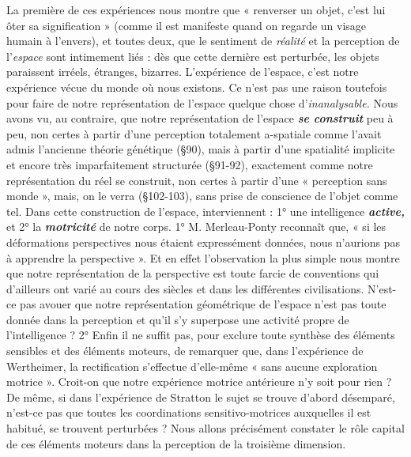 \vspace{0.31cm}

La première de ces expériences nous montre que « renverser un
objet, c’est lui ôter sa signification » (comme il est manifeste quand on
regarde un visage humain à l’envers), et toutes deux, que le sentiment
de {\it réalité} et la perception de l’{\it espace} sont intimement liés : dès que
cette dernière est perturbée, les objets paraissent irréels, étranges,
bizarres. L'expérience de l’espace, c’est notre expérience vécue du
monde où nous existons. Ce n’est pas une raison toutefois pour faire
de notre représentation de l’espace quelque chose d’{\it inanalysable.}
Nous avons vu, au contraire, que notre représentation de l’espace
\textbf{\textit {se construit}} peu à peu, non certes à partir d’une perception totalement
a-spatiale comme l’avait admis l’ancienne théorie génétique
(\S 90), mais à partir d’une spatialité implicite et encore très imparfaitement
structurée (\S 91-92), exactement comme notre représentation
du réel se construit, non certes à partir d’une « perception
sans monde », mais, on le verra (\S 102-103), sans prise de conscience
de l’objet comme tel. Dans cette construction de l’espace, interviennent :
1° une intelligence \textbf{\textit {active,}} et 2° la \textbf{\textit {motricité}} de notre
corps. 1° M. Merleau-Ponty reconnaît que, « si les déformations
perspectives nous étaient expressément données, nous
n’aurions pas à apprendre la perspective ». Et en effet l'observation
la plus simple nous montre que notre représentation de la perspective
est toute farcie de conventions
qui d’ailleurs ont varié au cours des siècles et dans les différentes
civilisations. 
N'est-ce pas avouer que notre représentation
géométrique de l’espace n’est pas toute donnée dans la
perception et qu’il s’y superpose une activité propre de l’intelligence ?
2° Enfin il ne suffit pas, pour exclure toute synthèse
des éléments sensibles et des éléments moteurs, de remarquer
que, dans l’expérience de Wertheimer, la rectification s’effectue
d’elle-même « sans aucune exploration motrice ». Croit-on
que notre expérience motrice antérieure n’y soit pour rien ? De
même, si dans l’expérience de
Stratton le sujet se trouve d’abord désemparé, n’est-ce pas que toutes
les coordinations sensitivo-motrices auxquelles il est habitué, se
trouvent perturbées ? Nous allons précisément constater le rôle
capital de ces éléments moteurs dans la perception de la troisième
dimension.

